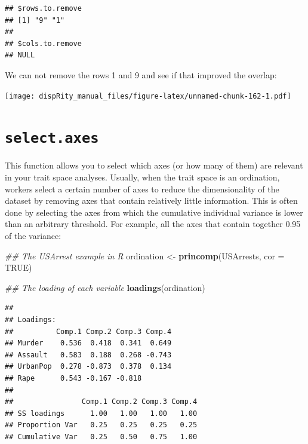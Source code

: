 \documentclass[
]{book}
\newenvironment{Shaded}{\begin{snugshade}}{\end{snugshade}}
\newcommand{\CommentTok}[1]{\textcolor[rgb]{0.56,0.35,0.01}{\textit{#1}}}
\newcommand{\DataTypeTok}[1]{\textcolor[rgb]{0.13,0.29,0.53}{#1}}
\newcommand{\KeywordTok}[1]{\textcolor[rgb]{0.13,0.29,0.53}{\textbf{#1}}}
\newcommand{\NormalTok}[1]{#1}
\newcommand{\OperatorTok}[1]{\textcolor[rgb]{0.81,0.36,0.00}{\textbf{#1}}}
\newcommand{\OtherTok}[1]{\textcolor[rgb]{0.56,0.35,0.01}{#1}}
\newcommand{\StringTok}[1]{\textcolor[rgb]{0.31,0.60,0.02}{#1}}
\begin{document}
\begin{verbatim}
## $rows.to.remove
## [1] "9" "1"
## 
## $cols.to.remove
## NULL
\end{verbatim}

We can not remove the rows 1 and 9 and see if that improved the overlap:

\begin{Shaded}
\end{Shaded}

\texttt{[image: dispRity\_manual\_files/figure-latex/unnamed-chunk-162-1.pdf]}

\hypertarget{select.axes}{%
\section{\texorpdfstring{\texttt{select.axes}}{select.axes}}\label{select.axes}}

This function allows you to select which axes (or how many of them) are relevant in your trait space analyses.
Usually, when the trait space is an ordination, workers select a certain number of axes to reduce the dimensionality of the dataset by removing axes that contain relatively little information.
This is often done by selecting the axes from which the cumulative individual variance is lower than an arbitrary threshold.
For example, all the axes that contain together 0.95 of the variance:

\begin{Shaded}
\begin{Highlighting}[]
\CommentTok{\#\# The USArrest example in R}
\NormalTok{ordination \textless{}{-}}\StringTok{ }\KeywordTok{princomp}\NormalTok{(USArrests, }\DataTypeTok{cor =} \OtherTok{TRUE}\NormalTok{)}

\CommentTok{\#\# The loading of each variable}
\KeywordTok{loadings}\NormalTok{(ordination)}
\end{Highlighting}
\end{Shaded}

\begin{verbatim}
## 
## Loadings:
##          Comp.1 Comp.2 Comp.3 Comp.4
## Murder    0.536  0.418  0.341  0.649
## Assault   0.583  0.188  0.268 -0.743
## UrbanPop  0.278 -0.873  0.378  0.134
## Rape      0.543 -0.167 -0.818       
## 
##                Comp.1 Comp.2 Comp.3 Comp.4
## SS loadings      1.00   1.00   1.00   1.00
## Proportion Var   0.25   0.25   0.25   0.25
## Cumulative Var   0.25   0.50   0.75   1.00
\end{verbatim}
\end{document}
